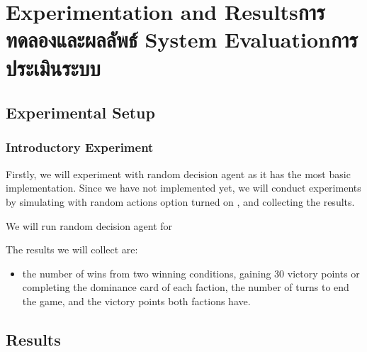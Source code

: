 \chapter{\ifproject%
\ifenglish Experimentation and Results\else การทดลองและผลลัพธ์\fi
\else%
\ifenglish System Evaluation\else การประเมินระบบ\fi
\fi}


\section{Experimental Setup}

\subsection{Introductory Experiment}
Firstly, we will experiment with random decision agent as it has the most basic implementation. Since we have not implemented \RootAI yet, we will conduct experiments by simulating \RootOurs with random actions option turned on , and collecting the results. 

We will run random decision agent for 

The results we will collect are:
\begin{itemize}
    \item the number of wins from two winning conditions, gaining 30 victory points or completing the dominance card of each faction, the number of turns to end the game, and the victory points both factions have.
\end{itemize}

\section{Results}